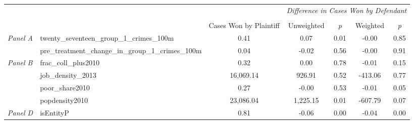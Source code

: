 \begin{tabular}{llccccc}
\toprule
 &  & \textit{} & \multicolumn{4}{c}{\textit{Difference in Cases Won by Defendant}} \\
\cline{4-7}
\\
 &  & Cases Won by Plaintiff & Unweighted & \emph{p} & Weighted & \emph{p} \\
\midrule
\multirow[c]{2}{3cm}{\textit{Panel A}} & twenty_seventeen_group_1_crimes_100m & 0.41 & 0.07 & 0.01 & -0.00 & 0.85 \\
 & pre_treatment_change_in_group_1_crimes_100m & 0.04 & -0.02 & 0.56 & -0.00 & 0.91 \\
\cline{1-7}
\multirow[c]{4}{3cm}{\textit{Panel B}} & frac_coll_plus2010 & 0.32 & 0.00 & 0.78 & -0.01 & 0.15 \\
 & job_density_2013 & 16,069.14 & 926.91 & 0.52 & -413.06 & 0.77 \\
 & poor_share2010 & 0.27 & -0.00 & 0.53 & -0.01 & 0.05 \\
 & popdensity2010 & 23,086.04 & 1,225.15 & 0.01 & -607.79 & 0.07 \\
\cline{1-7}
\textit{Panel D} & isEntityP & 0.81 & -0.06 & 0.00 & -0.04 & 0.00 \\
\cline{1-7}
\bottomrule
\end{tabular}
